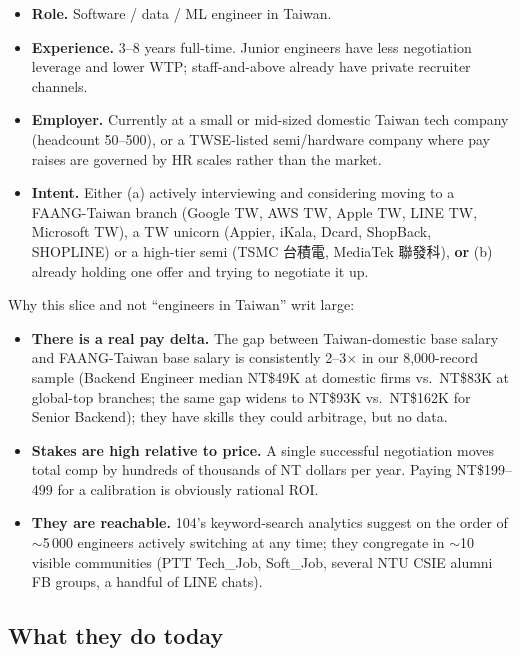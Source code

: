 \documentclass[11pt,a4paper]{article}
\begin{document}
\begin{itemize}[leftmargin=*,itemsep=0.1em,topsep=0.2em]
  \item \textbf{Role.} Software / data / ML engineer in Taiwan.
  \item \textbf{Experience.} 3--8 years full-time. Junior engineers have less
    negotiation leverage and lower WTP; staff-and-above already have private
    recruiter channels.
  \item \textbf{Employer.} Currently at a small or mid-sized domestic Taiwan
    tech company (head\-count 50--500), or a TWSE-listed semi/hardware company
    where pay raises are governed by HR scales rather than the market.
  \item \textbf{Intent.} Either (a) actively interviewing and considering
    moving to a FAANG-Taiwan branch (Google TW, AWS TW, Apple TW, LINE TW,
    Microsoft TW), a TW unicorn (Appier, iKala, Dcard, ShopBack, SHOPLINE)
    or a high-tier semi (TSMC 台積電, MediaTek 聯發科), \textbf{or} (b) already
    holding one offer and trying to negotiate it up.
\end{itemize}

Why this slice and not ``engineers in Taiwan'' writ large:

\begin{itemize}[leftmargin=*,itemsep=0.1em,topsep=0.2em]
  \item \textbf{There is a real pay delta.} The gap between Taiwan-domestic
    base salary and FAANG-Taiwan base salary is consistently 2--3$\times$
    in our 8{,}000-record sample (Backend Engineer median NT\$49K at
    domestic firms vs.\ NT\$83K at global-top branches; the same gap
    widens to NT\$93K vs.\ NT\$162K for Senior Backend); they have
    skills they could arbitrage, but no data.
  \item \textbf{Stakes are high relative to price.} A single successful
    negotiation moves total comp by hundreds of thousands of NT dollars per
    year. Paying NT\$199--499 for a calibration is obviously rational ROI.
  \item \textbf{They are reachable.} 104's keyword-search analytics suggest
    on the order of $\sim$5\,000 engineers actively switching at any time;
    they congregate in $\sim$10 visible communities (PTT Tech\_Job,
    Soft\_Job, several NTU CSIE alumni FB groups, a handful of LINE chats).
\end{itemize}

\subsection*{What they do today}
\end{document}

